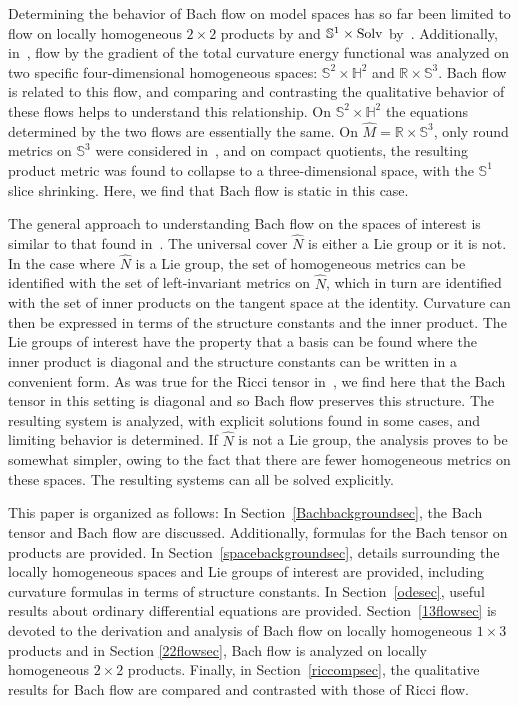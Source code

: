 \documentclass[10pt,a4paper]{amsart}
\numberwithin{equation}{section}
\begin{document}
Determining the behavior of Bach flow on model spaces has so far been limited to flow on locally homogeneous $2 \times 2$ products by \cite{DasKar} and $\mathbb{S}^1 \times {\rm Solv}$ by~\cite{Ho}. Additionally, in~\cite{Streets}, flow by the gradient of the total curvature energy functional was analyzed on two specific four-dimensional homogeneous spaces: $\mathbb{S}^2 \times \mathbb{H}^2$ and $\mathbb{R} \times \mathbb{S}^3$. Bach flow is related to this flow, and comparing and contrasting the qualitative behavior of these flows helps to understand this relationship. On $\mathbb{S}^2 \times \mathbb{H}^2$ the equations determined by the two flows are essentially the same. On $\widehat{M} = \mathbb{R} \times \mathbb{S}^3$, only round metrics on $\mathbb{S}^3$ were considered in~\cite{Streets}, and on compact quotients, the resulting product metric was found to collapse to a three-dimensional space, with the $\mathbb{S}^1$ slice shrinking. Here, we find that Bach flow is static in this case.

The general approach to understanding Bach flow on the spaces of interest is similar to that found in~\cite{IJ}. The universal cover $\widehat{N}$ is either a Lie group or it is not. In the case where $\widehat{N}$ is a Lie group, the set of homogeneous metrics can be identified with the set of left-invariant metrics on $\widehat{N}$, which in turn are identified with the set of inner products on the tangent space at the identity. Curvature can then be expressed in terms of the structure constants and the inner product. The Lie groups of interest have the property that a basis can be found where the inner product is diagonal and the structure constants can be written in a convenient form. As was true for the Ricci tensor in~\cite{IJ}, we find here that the Bach tensor in this setting is diagonal and so Bach flow preserves this structure. The resulting system is analyzed, with explicit solutions found in some cases, and limiting behavior is determined. If $\widehat{N}$ is not a Lie group, the analysis proves to be somewhat simpler, owing to the fact that there are fewer homogeneous metrics on these spaces. The resulting systems can all be solved explicitly.

This paper is organized as follows: In Section~\ref{Bachbackgroundsec}, the Bach tensor and Bach flow are discussed. Additionally, formulas for the Bach tensor on products are provided. In Section~\ref{spacebackgroundsec}, details surrounding the locally homogeneous spaces and Lie groups of interest are provided, including curvature formulas in terms of structure constants. In Section~\ref{odesec}, useful results about ordinary differential equations are provided. Section~\ref{13flowsec} is devoted to the derivation and analysis of Bach flow on locally homogeneous $1 \times 3$ products and in Section \ref{22flowsec}, Bach flow is analyzed on locally homogeneous $2 \times 2$ products. Finally, in Section~\ref{riccompsec}, the qualitative results for Bach flow are compared and contrasted with those of Ricci flow.
\end{document}
